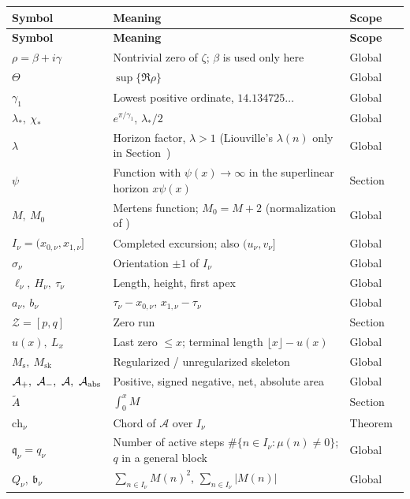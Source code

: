 \documentclass[11pt,reqno]{amsart}
\makeatletter
\let\CG@origref\ref
\newcommand{\CG@gettip}[1]{\@ifundefined{CGTip@#1}{Reference: #1}{\csname CGTip@#1\endcsname}}
\DeclareRobustCommand{\CGref}[1]{\pdftooltip{\CG@origref{#1}}{\CG@gettip{#1}}}
\let\CG@origcite\cite
\renewcommand*{\cite}[2][]{\def\CG@citekey{#2}%
  \ifx\relax#1\relax\CG@origcite{#2}\else\CG@origcite[#1]{#2}\fi}
\numberwithin{equation}{section}
\theoremstyle{plain}
\theoremstyle{definition}
\theoremstyle{remark}
\newcommand{\Ms}{M_{\mathrm{s}}}
\newcommand{\Msk}{M_{\mathrm{sk}}}
\newcommand{\Ap}{\mathcal{A}_{+}}
\newcommand{\Am}{\mathcal{A}_{-}}
\newcommand{\Anet}{\mathcal{A}}
\makeatother
\begin{document}
\small
\setlength{\LTpre}{4pt}
\setlength{\LTpost}{8pt}
\begin{longtable}{@{}p{}p{}p{}@{}}
\toprule
\textbf{Symbol} & \textbf{Meaning} & \textbf{Scope}\\
\midrule
\endfirsthead
\toprule
\textbf{Symbol} & \textbf{Meaning} & \textbf{Scope}\\
\midrule
\endhead
$\rho=\beta+i\gamma$ & Nontrivial zero of $\zeta$; $\beta$ is used only here & Global\\
$\Theta$ & $\sup\{\Re\rho\}$ & Global\\
$\gamma_1$ & Lowest positive ordinate, $14.134725\ldots$ & Global\\
$\lambda_*,\ \chi_*$ & $e^{\pi/\gamma_1}$, $\lambda_*/2$ & Global\\
$\lambda$ & Horizon factor, $\lambda>1$ (Liouville's $\lambda(n)$ only in Section~\CGref{subsec:intro-liouville}) & Global\\
$\psi$ & Function with $\psi(x)\to\infty$ in the superlinear horizon $x\psi(x)$ & Section~\CGref{sec:lacunary}\\
$M,\ M_0$ & Mertens function; $M_0=M+2$ (normalization of \cite{KP86}) & Global\\
$I_\nu=(x_{0,\nu},x_{1,\nu}]$ & Completed excursion; also $(u_\nu,v_\nu]$ & Global\\
$\sigma_\nu$ & Orientation $\pm1$ of $I_\nu$ & Global\\
$\ell_\nu,\ H_\nu,\ \tau_\nu$ & Length, height, first apex & Global\\
$a_\nu,\ b_\nu$ & $\tau_\nu-x_{0,\nu}$, $x_{1,\nu}-\tau_\nu$ & Global\\
$\mathcal Z=[p,q]$ & Zero run & Section~\CGref{sec:formulas}\\
$u(x),\ L_x$ & Last zero $\le x$; terminal length $\lfloor x\rfloor-u(x)$ & Global\\
$\Ms,\ \Msk$ & Regularized / unregularized skeleton & Global\\
$\Ap,\ \Am,\ \Anet,\ \mathcal A_{\rm abs}$ & Positive, signed negative, net, absolute area & Global\\
$\widetilde A$ & $\int_0^xM$ & Section~\CGref{sec:zeta}\\
$\mathrm{ch}_\nu$ & Chord of $\Anet$ over $I_\nu$ & Theorem~\CGref{thm:energy}\\
$\mathfrak q_\nu=q_\nu$ & Number of active steps $\#\{n\in I_\nu:\mu(n)\ne0\}$; $q$ in a general block & Global\\
$Q_\nu,\ \mathfrak b_\nu$ & $\sum_{n\in I_\nu}M(n)^2$, $\sum_{n\in I_\nu}|M(n)|$ & Global\\

\end{longtable}
\end{document}
